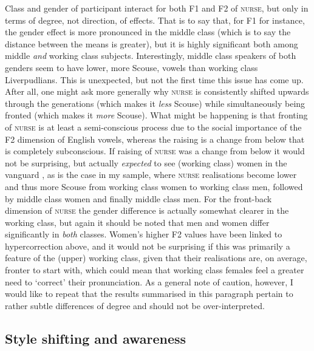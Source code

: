 Class and gender of participant interact for both F1 and F2 of \textsc{nurse}, but only in terms of degree, not direction, of effects.
That is to say that, for F1 for instance, the gender effect is more pronounced in the middle class (which is to say the distance between the means is greater), but it is highly significant both among middle \emph{and} working class subjects.
Interestingly, middle class speakers of both genders seem to have lower, more Scouse, vowels than working class Liverpudlians.
This is unexpected, but not the first time this issue has come up.
After all, one might ask more generally why \textsc{nurse} is consistently shifted upwards through the generations (which makes it \emph{less} Scouse) while simultaneously being fronted (which makes it \emph{more} Scouse).
What might be happening is that fronting of \textsc{nurse} is at least a semi-conscious process due to the social importance of the F2 dimension of English vowels, whereas the raising is a change from below that is completely subconscious.
If raising of \textsc{nurse} was a change from below it would not be surprising, but actually \emph{expected} to see (working class) women in the vanguard \parencite[cf.][292--293]{labov2001a}, as is the case in my sample, where \textsc{nurse} realisations become lower and thus more Scouse from working class women to working class men, followed by middle class women and finally middle class men.
For the front-back dimension of \textsc{nurse} the gender difference is actually somewhat clearer in the working class, but again it should be noted that men and women differ significantly in \emph{both} classes.
Women's higher F2 values have been linked to hypercorrection above, and it would not be surprising if this was primarily a feature of the (upper) working class, given that their realisations are, on average, fronter to start with, which could mean that working class females feel a greater need to `correct' their pronunciation.
As a general note of caution, however, I would like to repeat that the results summarised in this paragraph pertain to rather subtle differences of degree and should not be over-interpreted.

\subsection{Style shifting and awareness}
\label{prod.disc.nurse.style}

